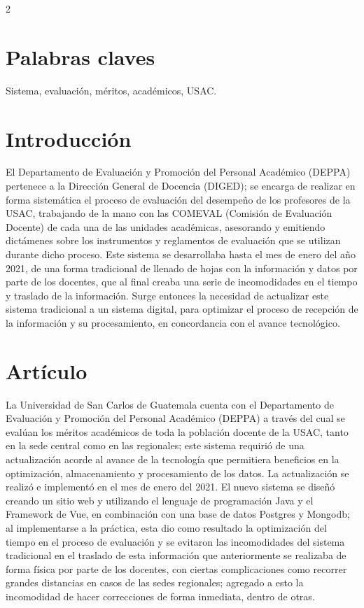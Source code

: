 \documentclass[12pt,spanish,Letterpaper,openany]{book}
\begin{document}
\begin {multicols}{2}
\hypertarget{palabras-claves-10}{%
\section{Palabras claves}\label{palabras-claves-10}}

Sistema, evaluación, méritos, académicos, USAC.

\hypertarget{introducciuxf3n-10}{%
\section{Introducción}\label{introducciuxf3n-10}}

El Departamento de Evaluación y Promoción del Personal Académico (DEPPA) pertenece a la Dirección General de Docencia (DIGED); se encarga de realizar en forma sistemática el proceso de evaluación del desempeño de los profesores de la USAC, trabajando de la mano con las COMEVAL (Comisión de Evaluación Docente) de cada una de las unidades académicas, asesorando y emitiendo dictámenes sobre los instrumentos y reglamentos de evaluación que se utilizan durante dicho proceso. Este sistema se desarrollaba hasta el mes de enero del año 2021, de una forma tradicional de llenado de hojas con la información y datos por parte de los docentes, que al final creaba una serie de incomodidades en el tiempo y traslado de la información. Surge entonces la necesidad de actualizar este sistema tradicional a un sistema digital, para optimizar el proceso de recepción de la información y su procesamiento, en concordancia con el avance tecnológico.

\hypertarget{artuxedculo-10}{%
\section{Artículo}\label{artuxedculo-10}}

La Universidad de San Carlos de Guatemala cuenta con el Departamento de Evaluación y Promoción del Personal Académico (DEPPA) a través del cual se evalúan los méritos académicos de toda la población docente de la USAC, tanto en la sede central como en las regionales; este sistema requirió de una actualización acorde al avance de la tecnología que permitiera beneficios en la optimización, almacenamiento y procesamiento de los datos. La actualización se realizó e implementó en el mes de enero del 2021. El nuevo sistema se diseñó creando un sitio web y utilizando el lenguaje de programación Java y el Framework de Vue, en combinación con una base de datos Postgres y Mongodb; al implementarse a la práctica, esta dio como resultado la optimización del tiempo en el proceso de evaluación y se evitaron las incomodidades del sistema tradicional en el traslado de esta información que anteriormente se realizaba de forma física por parte de los docentes, con ciertas complicaciones como recorrer grandes distancias en casos de las sedes regionales; agregado a esto la incomodidad de hacer correcciones de forma inmediata, dentro de otras.


\end{multicols}
\end{document}
